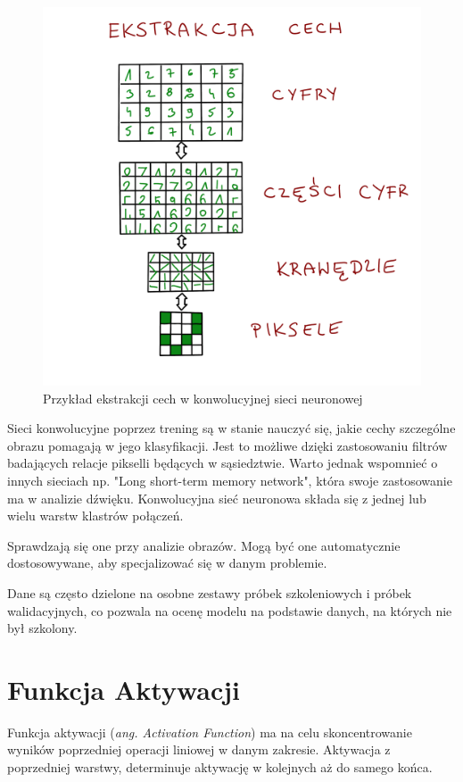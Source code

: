 \documentclass[brudnopis]{xmgr}
\begin{document}
\begin{figure}[!tbh]
\centering
\includegraphics[width=.8\hsize]{fig/10}
\caption{Przykład ekstrakcji cech w konwolucyjnej sieci neuronowej\label{RYS.2}}
\end{figure}

Sieci konwolucyjne poprzez trening są w stanie nauczyć się, jakie cechy szczególne obrazu pomagają w jego klasyfikacji. Jest to możliwe dzięki zastosowaniu filtrów badających relacje pikselli będących w sąsiedztwie. Warto jednak wspomnieć o innych sieciach np. "Long short-term memory network", która swoje zastosowanie ma w analizie dźwięku. Konwolucyjna sieć neuronowa składa się z jednej lub wielu warstw klastrów połączeń.

 Sprawdzają się one przy analizie obrazów.  Mogą być one automatycznie dostosowywane, aby specjalizować się w danym problemie.

Dane są często dzielone na osobne zestawy próbek szkoleniowych i próbek walidacyjnych, co pozwala na ocenę modelu na podstawie danych, na których nie był szkolony.





\section{Funkcja Aktywacji  \label{s:dsssl}}

Funkcja aktywacji  (\textit{ang. Activation Function}) ma na celu skoncentrowanie wyników poprzedniej operacji liniowej w danym zakresie.
Aktywacja z poprzedniej warstwy, determinuje aktywację w kolejnych aż do samego końca. 
\end{document}
